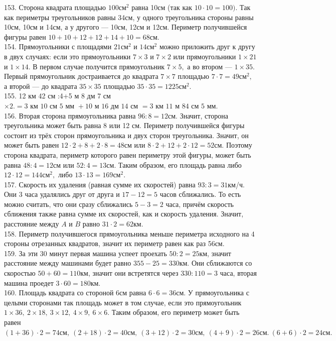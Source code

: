 \documentclass[12pt]{article}
\begin{document}
153. Сторона квадрата площадью $100\text{см}^2$ равна 10см (так как $10\cdot10=100).$ Так как периметры треугольников равны 34см, у одного треугольника стороны равны 10см, 10см и 14см, а у другого --- 10см, 12см и 12см. Периметр получившейся фигуры равен $10+10+12+12+14+10=68$см.\\
154. Прямоугольники с площадями $21\text{см}^2$ и $14\text{см}^2$ можно приложить друг к другу в двух случаях: если это прямоугольники $7\times3$ и $7\times2$ или прямоугольники $1\times21$ и $1\times14.$ В первом случае получится прямоугольник $7\times5,$ а во втором --- $1\times35.$ Первый прямоугольник достраивается до квадрата $7\times7$ площадью $7\cdot7=49\text{см}^2,$ а второй --- до квадрата $35\times35$ площадью $35\cdot35=1225\text{см}^2.$\\
155. 12 км 42 см :4+5 м 8 дм 7 см$\times2.=3\text{ км }10\text{ см }5\text{ мм }+10\text{ м }16\text{ дм }14\text{ см }=3\text{ км }11\text{ м }84\text{ см }5\text{ мм.}$\\
156. Вторая сторона прямоугольника равна $96:8=12$см. Значит, сторона треугольника может быть равна 8 или 12 см. Периметр получившейся фигуры состоит из трёх сторон прямоугольника и двух сторон треугольника. Значит, он может быть равен $12\cdot2+8+2\cdot8=48$см или $8\cdot2+12+2\cdot12=52$см. Поэтому сторона квадрата, периметр которого равен периметру этой фигуры, может быть равна $48:4=12$см или $52:4=13$см. Таким образом, его площадь равна либо $12\cdot12=144\text{см}^2,$ либо $13\cdot13=169\text{см}^2.$\\
157. Скорость их удаления (равная сумме их скоростей) равна $93:3=31$км/ч. Они 3 часа удалялись друг от друга и $17-12=5$ часов сближались. То есть можно считать, что они сразу сближались $5-3=2$ часа, причём скорость сближения также равна сумме их скоростей, как и скорость удаления. Значит, расстояние между  $A$ и $B$ равно $31\cdot2=62$км.\\
158. Периметр получившегося прямоугольника меньше периметра исходного на 4 стороны отрезанных квадратов, значит их периметр равен как раз 56см.\\
159. За эти 30 минут первая машина успеет проехать $50:2=25$км, значит расстояние между машинами будет равно $355-25=330$км. Они сближаются со скоростью $50+60=110$км, значит они встретятся через $330:110=3$ часа, вторая машина проедет $3\cdot60=180$км.\\
160. Площадь квадрата со стороной 6см равна $6\cdot6=36$см. У прямоугольника с целыми сторонами так площадь может в том случае, если это прямоугольник $1\times36,\ 2\times18,\ 3\times12,\ 4\times9,\ 6\times6.$ Таким образом, его периметр может быть равен $(1+36)\cdot2=74\text{см},\ (2+18)\cdot2=40\text{см},\ (3+12)\cdot2=30\text{см},\ (4+9)\cdot2=26\text{см}.\ (6+6)\cdot2=24\text{см}.$\\
\end{document}

